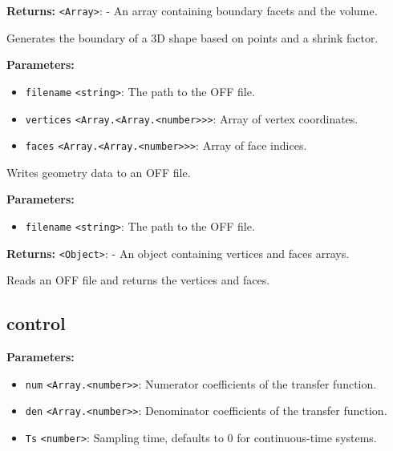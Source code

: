 \documentclass[12pt,a4paper]{article}
\begin{document}
\noindent \textbf{Returns:} \texttt{<Array>}: - An array containing boundary facets and the volume.

\noindent Generates the boundary of a 3D shape based on points and a shrink factor.

\vspace{5mm}
\noindent {}


\noindent \textbf{Parameters:}
\begin{itemize}
  \item \texttt{filename} \texttt{<string>}: The path to the OFF file.
  \item \texttt{vertices} \texttt{<Array.<Array.<number>>>}: Array of vertex coordinates.
  \item \texttt{faces} \texttt{<Array.<Array.<number>>>}: Array of face indices.
\end{itemize}

\noindent Writes geometry data to an OFF file.

\vspace{5mm}
\noindent {}


\noindent \textbf{Parameters:}
\begin{itemize}
  \item \texttt{filename} \texttt{<string>}: The path to the OFF file.
\end{itemize}

\noindent \textbf{Returns:} \texttt{<Object>}: - An object containing vertices and faces arrays.

\noindent Reads an OFF file and returns the vertices and faces.


\subsection{control}
\vspace{5mm}
\noindent {}


\noindent \textbf{Parameters:}
\begin{itemize}
  \item \texttt{num} \texttt{<Array.<number>>}: Numerator coefficients of the transfer function.
  \item \texttt{den} \texttt{<Array.<number>>}: Denominator coefficients of the transfer function.
  \item \texttt{Ts} \texttt{<number>}: Sampling time, defaults to 0 for continuous-time systems.
\end{itemize}
\end{document}
